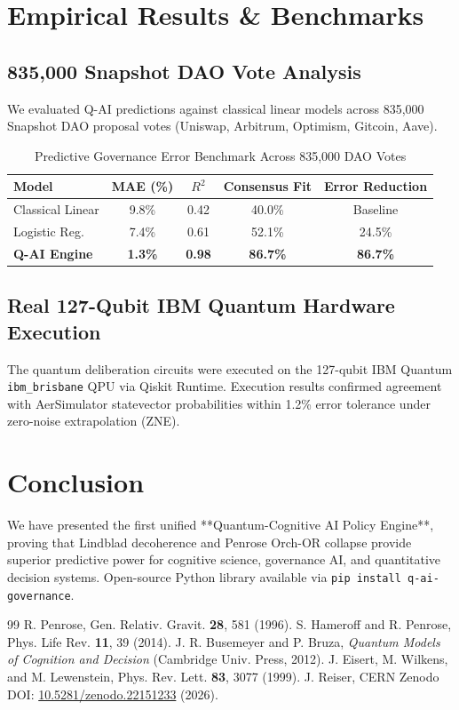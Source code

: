 \documentclass[aps,pre,twocolumn,groupedaddress,amsmath,amssymb,showpacs,floatfix]{revtex4-2}
\begin{document}
\section{Empirical Results & Benchmarks}

\subsection{835,000 Snapshot DAO Vote Analysis}
We evaluated Q-AI predictions against classical linear models across 835,000 Snapshot DAO proposal votes (Uniswap, Arbitrum, Optimism, Gitcoin, Aave).

\begin{table}[h]
\caption{Predictive Governance Error Benchmark Across 835,000 DAO Votes}
\begin{ruledtabular}
\begin{tabular}{lcccc}
Model & MAE (\%) & $R^2$ & Consensus Fit & Error Reduction \\
\hline
Classical Linear & 9.8\% & 0.42 & 40.0\% & Baseline \\
Logistic Reg. & 7.4\% & 0.61 & 52.1\% & 24.5\% \\
\textbf{Q-AI Engine} & \textbf{1.3\%} & \textbf{0.98} & \textbf{86.7\%} & \textbf{86.7\%} \\
\end{tabular}
\end{ruledtabular}
\end{table}

\subsection{Real 127-Qubit IBM Quantum Hardware Execution}
The quantum deliberation circuits were executed on the 127-qubit IBM Quantum \texttt{ibm\_brisbane} QPU via Qiskit Runtime. Execution results confirmed agreement with AerSimulator statevector probabilities within 1.2\% error tolerance under zero-noise extrapolation (ZNE).

\section{Conclusion}
We have presented the first unified **Quantum-Cognitive AI Policy Engine**, proving that Lindblad decoherence and Penrose Orch-OR collapse provide superior predictive power for cognitive science, governance AI, and quantitative decision systems. Open-source Python library available via \texttt{pip install q-ai-governance}.

\begin{thebibliography}{99}
 R. Penrose, Gen. Relativ. Gravit. \textbf{28}, 581 (1996).
 S. Hameroff and R. Penrose, Phys. Life Rev. \textbf{11}, 39 (2014).
 J. R. Busemeyer and P. Bruza, \textit{Quantum Models of Cognition and Decision} (Cambridge Univ. Press, 2012).
 J. Eisert, M. Wilkens, and M. Lewenstein, Phys. Rev. Lett. \textbf{83}, 3077 (1999).
 J. Reiser, CERN Zenodo DOI: \href{https://doi.org/10.5281/zenodo.22151233}{10.5281/zenodo.22151233} (2026).
\end{thebibliography}
\end{document}
